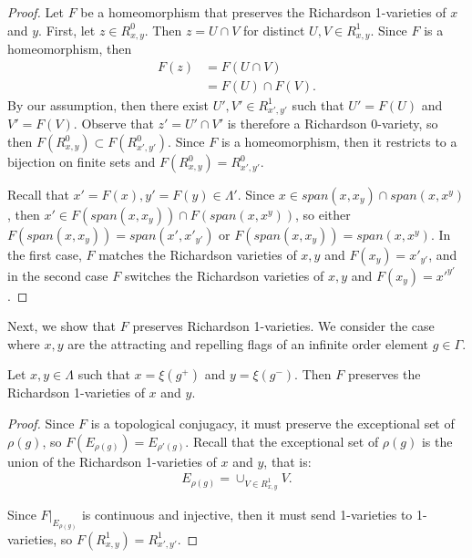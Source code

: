 \begin{proof}
    Let $F$ be a homeomorphism that preserves the Richardson 1-varieties of $x$ and $y$.
    First, let $z \in R^0_{x,y}$. Then $z = U \cap V$ for distinct $U,V \in R^1_{x,y}$.
    Since $F$ is a homeomorphism, then
    \begin{align}
        F(z) &= F(U \cap V) \\
        &= F(U) \cap F(V).
    \end{align}
    By our assumption, then there exist $U',V' \in R^1_{x',y'}$ such that $U' = F(U)$ and $V' = F(V)$.
    Observe that $z' = U' \cap V'$ is therefore a Richardson 0-variety, 
    so then $F(R^0_{x,y}) \subset F(R^0_{x',y'})$.
    Since $F$ is a homeomorphism, 
    then it restricts to a bijection on finite sets and $F(R^0_{x,y}) = R^0_{x',y'}$.
    
    Recall that $x' = F(x), y' = F(y) \in \Lambda'$. 
    Since $x \in span(x,x_y) \cap span(x,x^y)$, then $x' \in F(span(x,x_y)) \cap F(span(x,x^y))$,
    so either $F(span(x,x_y)) = span(x',x'_{y'})$ or $F(span(x,x_y)) = span(x,x^y)$.
    In the first case, $F$ matches the Richardson varieties of $x,y$ and $F(x_y) = x'_{y'}$, 
    and in the second case $F$ switches the Richardson varieties of $x,y$ and $F(x_y) = x'^{y'}$.
\end{proof}

Next, we show that $F$ preserves Richardson 1-varieties.
We consider the case where $x,y$ are the attracting and repelling flags of an infinite order element $g \in \Gamma$.
\begin{proposition}\label{prop:x_y}
    Let $x,y \in \Lambda$ such that $x=\xi(g^+)$ and $y = \xi(g^-)$. 
    Then $F$ preserves the Richardson 1-varieties of $x$ and $y$.
\end{proposition}

\begin{proof}
    Since $F$ is a topological conjugacy, it must preserve the exceptional set of $\rho(g)$, 
    so $F(E_{\rho(g)}) = E_{\rho'(g)}$.
    Recall that the exceptional set of $\rho(g)$ is the union of the Richardson 1-varieties of $x$ and $y$,
    that is:
    \begin{align}
        E_{\rho(g)} = \cup_{V \in R^1_{x,y}} V.
    \end{align}

    Since $F|_{E_{\rho(g)}}$ is continuous and injective, then it must send 1-varieties to 1-varieties,
    so $F(R^1_{x,y}) = R^1_{x',y'}$.
\end{proof}

